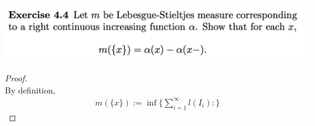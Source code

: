 \newpage
\begin{mdframed}
\includegraphics[width=400pt]{img/analysis--berkeley-202a-hw04-c0b6.png}
\end{mdframed}

\begin{proof}~\\
  By definition,
  \begin{align*}
    m(\{x\}) := \inf \Big\{\sum_{i=1}^\infty l(I_i) : \Big\}
  \end{align*}

\end{proof}




























